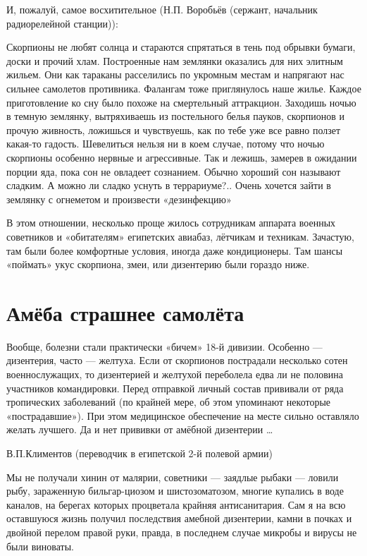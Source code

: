 И, пожалуй, самое восхитительное (Н.П. Воробьёв (сержант, начальник радиорелейной станции)):
\begin{textcitation}
	Скорпионы не любят солнца и стараются спрятаться в тень под обрывки бумаги, доски и прочий хлам. Построенные нам землянки оказались для них элитным жильем. Они как тараканы расселились по укромным местам и напрягают нас сильнее самолетов противника. Фалангам тоже приглянулось наше жилье. Каждое приготовление ко сну было похоже на смертельный аттракцион. Заходишь ночью в темную землянку, вытряхиваешь из постельного белья пауков, скорпионов и прочую живность, ложишься и чувствуешь, как по тебе уже все равно ползет какая-то гадость. Шевелиться нельзя ни в коем случае, потому что ночью скорпионы особенно нервные и агрессивные. Так и лежишь, замерев в ожидании порции яда, пока сон не овладеет сознанием. Обычно хороший сон называют сладким. А можно ли сладко уснуть в террариуме?.. Очень хочется зайти в землянку с огнеметом и произвести «дезинфекцию»
\end{textcitation}

В этом отношении, несколько проще жилось сотрудникам аппарата военных советников и «обитателям» египетских авиабаз, лётчикам и техникам. Зачастую, там были более комфортные условия, иногда даже кондиционеры. Там шансы «поймать» укус скорпиона, змеи, или дизентерию были гораздо ниже.

\section{Амёба страшнее самолёта}

Вообще, болезни стали практически «бичем» 18-й дивизии. Особенно — дизентерия, часто — желтуха. Если от скорпионов пострадали несколько сотен военнослужащих, то дизентерией и желтухой переболела едва ли не половина участников командировки. Перед отправкой личный состав прививали от ряда тропических заболеваний (по крайней мере, об этом упоминают некоторые «пострадавшие»). При этом медицинское обеспечение на месте сильно оставляло желать лучшего. Да и нет прививки от амёбной дизентерии …

В.П.Климентов (переводчик в египетской 2-й полевой армии)

\begin{textcitation}
	Мы не получали хинин от малярии, советники — заядлые рыбаки — ловили рыбу, зараженную бильгар-циозом и шистозоматозом, многие купались в воде каналов, на берегах которых процветала крайняя антисанитария. Сам я на всю оставшуюся жизнь получил последствия амебной дизентерии, камни в почках и двойной перелом правой руки, правда, в последнем случае микробы и вирусы не были виноваты.
\end{textcitation}

